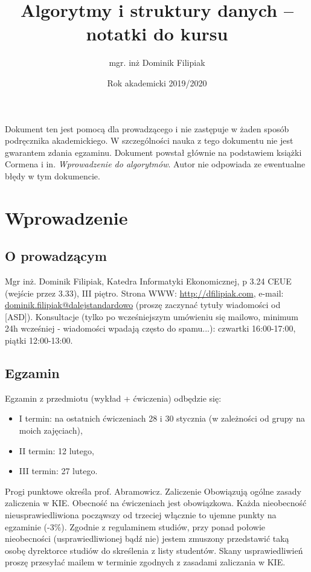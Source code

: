 \documentclass[10pt, oneside]{article}
\title{Algorytmy i struktury danych -- notatki do kursu}
\author{mgr. inż Dominik Filipiak}
\date{Rok akademicki 2019/2020}
\theoremstyle{remark}
\begin{document}
\maketitle
\tableofcontents

\vspace{.25in}

Dokument ten jest pomocą dla prowadzącego i nie zastępuje w żaden sposób podręcznika akademickiego.
W szczególności nauka z tego dokumentu nie jest gwarantem zdania egzaminu.
Dokument powstał głównie na podstawiem książki Cormena i in. \emph{Wprowadzenie do algorytmów}.
Autor nie odpowiada ze ewentualne błędy w tym dokumencie.

\section{Wprowadzenie}

\subsection{O prowadzącym}
Mgr inż. Dominik Filipiak, Katedra Informatyki Ekonomicznej, p 3.24 CEUE (wejście przez 3.33), III piętro.
Strona WWW: \url{http://dfilipiak.com}, e-mail: \url{dominik.filipiak@dalejstandardowo} (proszę zaczynać tytuły wiadomości od [ASD]).
Konsultacje (tylko po wcześniejszym umówieniu się mailowo, minimum 24h wcześniej - wiadomości wpadają często do spamu...): czwartki 16:00-17:00, piątki 12:00-13:00.

\subsection{Egzamin}
Egzamin z przedmiotu (wykład + ćwiczenia) odbędzie się:
\begin{itemize}
	\item I termin: na ostatnich ćwiczeniach 28 i 30 stycznia (w zależności od grupy na moich zajęciach),
	\item II termin: 12 lutego,
	\item III termin: 27 lutego.
\end{itemize}
Progi punktowe określa prof. Abramowicz.
Zaliczenie
Obowiązują ogólne zasady zaliczenia w KIE. Obecność na ćwiczeniach jest obowiązkowa. Każda nieobecność nieusprawiedliwiona począwszy od trzeciej włącznie to ujemne punkty na egzaminie (-3\%).
Zgodnie z regulaminem studiów, przy ponad połowie nieobecności (usprawiedliwionej bądź nie) jestem zmuszony przedstawić taką osobę dyrektorce studiów do skreślenia z listy studentów. Skany usprawiedliwień proszę przesyłać mailem w terminie zgodnych z zasadami zaliczania w KIE.
\end{document}
